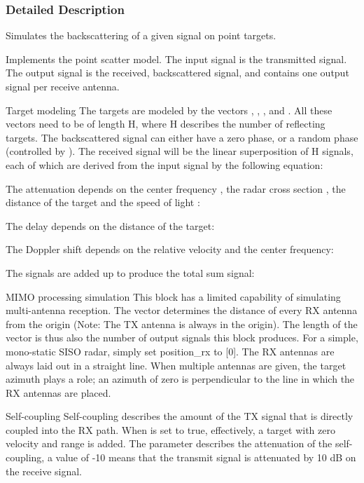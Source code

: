 \subsubsection{Detailed Description}
\begin{DoxyVerb}Simulates the backscattering of a given signal on point targets.

Implements the point scatter model. The input signal is the transmitted signal. The output signal is the received, backscattered signal, and contains one output signal per receive antenna.


Target modeling
The targets are modeled by the vectors , , , and . All these vectors need to be of length H, where H describes the number of reflecting targets. The backscattered signal can either have a zero phase, or a random phase (controlled by ). The received signal will be the linear superposition of H signals, each of which are derived from the input signal by the following equation:



The attenuation depends on the center frequency , the radar cross section , the distance of the target  and the speed of light : 

The delay  depends on the distance of the target: 

The Doppler shift  depends on the relative velocity and the center frequency: 

The signals are added up to produce the total sum signal: 



MIMO processing simulation
This block has a limited capability of simulating multi-antenna reception. The  vector determines the distance of every RX antenna from the origin (Note: The TX antenna is always in the origin). The length of the  vector is thus also the number of output signals this block produces. For a simple, mono-static SISO radar, simply set position_rx to [0]. The RX antennas are always laid out in a straight line. When multiple antennas are given, the target azimuth plays a role; an azimuth of zero is perpendicular to the line in which the RX antennas are placed.



Self-coupling
Self-coupling describes the amount of the TX signal that is directly coupled into the RX path. When  is set to true, effectively, a target with zero velocity and range is added. The parameter  describes the attenuation of the self-coupling, a value of -10 means that the transmit signal is attenuated by 10 dB on the receive signal.
\end{DoxyVerb}
 

